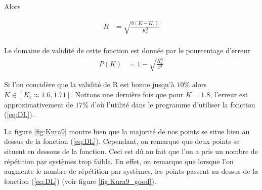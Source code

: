\documentclass[a4paper, 11pt]{article}
\begin{document}
Alors 

\begin{align*}
R& = \sqrt{\frac{8 (K-K_{c})}{ K_{c}^{3}}}\\
\end{align*}

Le domaine de validité de cette fonction est donnée par le pourcentage d'erreur 
\begin{align*}
P(K)&= 1-\sqrt{\frac{K_{c}^{3}}{x^{3}}}
\end{align*}

Si l'on concidère que la validité de R est bonne jusqu'à $ 10 \% $ alors $K\in [K_{c}\approx 1.6,1.71]$.
Nottons une dernière fois que pour $K = 1.8$, l'erreur est approximativement de $17\%$ d'où l'utilité dans le programme d'utiliser la fonction (\ref{eq:DL}).

La figure \ref{fig:Kura9} montre bien que la majorité de nos points se situe bien au dessus de la fonction (\ref{eq:DL}). Cependant, on remarque que deux points se situent en dessous de la fonction. Ceci est dû au fait que l'on a pris un nombre de répétition par systèmes trop faible.
En effet, on remarque que lorsque l'on augmente le nombre de répétition par systèmes, les points passent au dessus de la fonction (\ref{eq:DL}) (voir figure \ref{fig:Kura9_good}).
\end{document}
